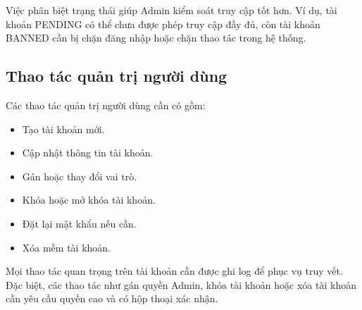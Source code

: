 Việc phân biệt trạng thái giúp Admin kiểm soát truy cập tốt hơn. Ví dụ, tài khoản PENDING có thể chưa được phép truy cập đầy đủ, còn tài khoản BANNED cần bị chặn đăng nhập hoặc chặn thao tác trong hệ thống.

\subsection{Thao tác quản trị người dùng}

Các thao tác quản trị người dùng cần có gồm:

\begin{itemize}
    \item Tạo tài khoản mới.
    \item Cập nhật thông tin tài khoản.
    \item Gán hoặc thay đổi vai trò.
    \item Khóa hoặc mở khóa tài khoản.
    \item Đặt lại mật khẩu nếu cần.
    \item Xóa mềm tài khoản.
\end{itemize}

Mọi thao tác quan trọng trên tài khoản cần được ghi log để phục vụ truy vết. Đặc biệt, các thao tác như gán quyền Admin, khóa tài khoản hoặc xóa tài khoản cần yêu cầu quyền cao và có hộp thoại xác nhận.
